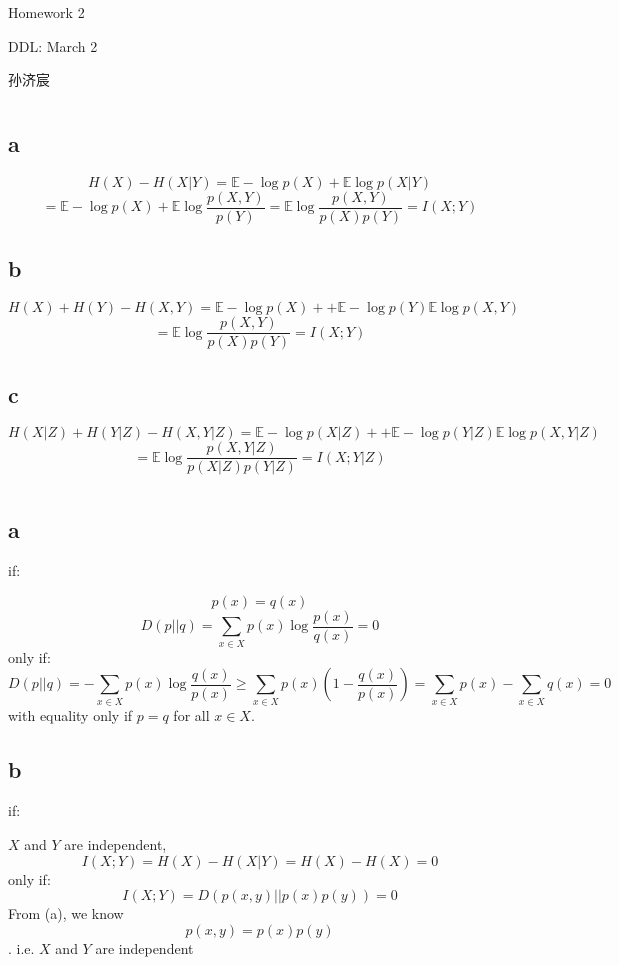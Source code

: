 \documentclass[12pt,a4paper]{article}
\newcommand{\mb}{\mathbb}
\begin{document}

Homework 2

DDL: March 2

孙济宸 

\section{}
\subsection{a}
$$H(X) - H(X|Y) = \mb{E}-\log p(X) + \mb{E} \log p(X|Y)$$
$$=\mb{E}-\log p(X) + \mb{E} \log \frac{p(X,Y)}{p(Y)} = \mb{E}\log \frac{p(X,Y)}{p(X)p(Y)} = I(X;Y)$$

\subsection{b}
$$H(X) + H(Y) -  H(X,Y) = \mb{E}-\log p(X) + + \mb{E}-\log p(Y) \mb{E} \log p(X,Y)$$
$$= \mb{E}\log \frac{p(X,Y)}{p(X)p(Y)} = I(X;Y)$$

\subsection{c}
$$H(X|Z) + H(Y|Z) -  H(X,Y|Z) = \mb{E}-\log p(X|Z) + + \mb{E}-\log p(Y|Z) \mb{E} \log p(X,Y|Z)$$
$$= \mb{E}\log \frac{p(X,Y|Z)}{p(X|Z)p(Y|Z)} = I(X;Y|Z)$$
\section{}
\subsection{a}\noindent
if: 

$$p(x)= q(x)$$
$$D(p||q) = \sum_{x\in X} p(x)\log \frac{p(x)}{q(x)}=0$$
only if: 
$$D(p||q) = -\sum_{x\in X} p(x)\log \frac{q(x)}{p(x)} \geq \sum_{x\in X} p(x)(1-\frac{q(x)}{p(x)}) = \sum_{x\in X} p(x) - \sum_{x\in X} q(x) =0$$
with equality only if $p=q$ for all $x\in X$.
\subsection{b}\noindent
if: 

$X$ and $Y$ are independent,
$$I(X;Y) = H(X) - H(X|Y)= H(X) - H(X) = 0$$
only if:
$$I(X;Y) = D(p(x,y)||p(x)p(y)) = 0$$
From (a), we know $$p(x,y)=p(x)p(y)$$. i.e. $X$ and $Y$ are independent
\end{document}
